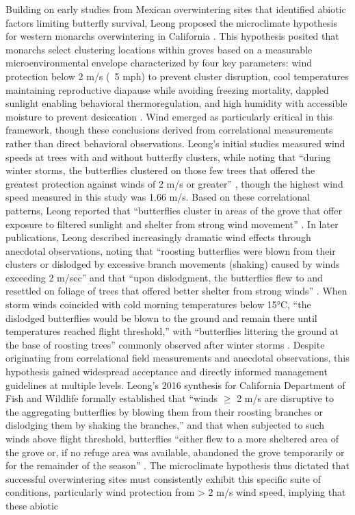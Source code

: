 Building on early studies from Mexican overwintering sites that identified abiotic factors limiting butterfly survival, Leong proposed the microclimate hypothesis for western monarchs overwintering in California \parencite{leongMicroenvironmentalFactorsAssociated1990}. This hypothesis posited that monarchs select clustering locations within groves based on a measurable microenvironmental envelope characterized by four key parameters: wind protection below 2 m/s (~5 mph) to prevent cluster disruption, cool temperatures maintaining reproductive diapause while avoiding freezing mortality, dappled sunlight enabling behavioral thermoregulation, and high humidity with accessible moisture to prevent desiccation \parencite{leongMicroenvironmentalFactorsAssociated1990,leongUseMultivariateAnalyses1991}. Wind emerged as particularly critical in this framework, though these conclusions derived from correlational measurements rather than direct behavioral observations. Leong's initial studies measured wind speeds at trees with and without butterfly clusters, while noting that ``during winter storms, the butterflies clustered on those few trees that offered the greatest protection against winds of 2 m/s or greater'' \parencite{leongMicroenvironmentalFactorsAssociated1990}, though the highest wind speed measured in this study was 1.66 m/s. Based on these correlational patterns, Leong reported that ``butterflies cluster in areas of the grove that offer exposure to filtered sunlight and shelter from strong wind movement'' \parencite{leongUseMultivariateAnalyses1991}. In later publications, Leong described increasingly dramatic wind effects through anecdotal observations, noting that ``roosting butterflies were blown from their clusters or dislodged by excessive branch movements (shaking) caused by winds exceeding 2 m/sec'' and that ``upon dislodgment, the butterflies flew to and resettled on foliage of trees that offered better shelter from strong winds'' \parencite{leongRestorationOverwinteringGrove1999}. When storm winds coincided with cold morning temperatures below 15°C, ``the dislodged butterflies would be blown to the ground and remain there until temperatures reached flight threshold,'' with ``butterflies littering the ground at the base of roosting trees'' commonly observed after winter storms \parencite{leongRestorationOverwinteringGrove1999}. Despite originating from correlational field measurements and anecdotal observations, this hypothesis gained widespread acceptance and directly informed management guidelines at multiple levels. Leong's 2016 synthesis for California Department of Fish and Wildlife formally established that ``winds $\geq$ 2 m/s are disruptive to the aggregating butterflies by blowing them from their roosting branches or dislodging them by shaking the branches,'' and that when subjected to such winds above flight threshold, butterflies ``either flew to a more sheltered area of the grove or, if no refuge area was available, abandoned the grove temporarily or for the remainder of the season'' \parencite{leongEvaluationManagementCalifornia2016}. The microclimate hypothesis thus dictated that successful overwintering sites must consistently exhibit this specific suite of conditions, particularly wind protection from > 2 m/s wind speed, implying that these abiotic 